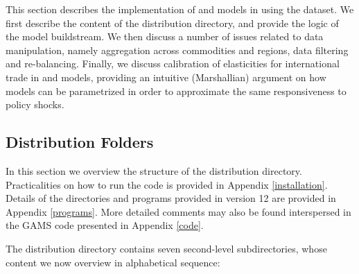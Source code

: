 This section describes the implementation of \GMR and \SOE models in
\GAMS using the  dataset. We first describe the content of the
distribution directory, and provide the logic of the model
buildstream. We then discuss a number of issues related to data
manipulation, namely aggregation across commodities and regions, data
filtering and re-balancing. Finally, we discuss calibration of
elasticities for international trade in \GMR and \SOE models,
providing an intuitive (Marshallian) argument on how models can be
parametrized in order to approximate the same responsiveness to
policy shocks.

\subsection{Distribution Folders}

In this section we overview the structure of the distribution
directory. Practicalities on how to run the code is provided in
Appendix \ref{installation}. Details of the directories and \GAMS
programs provided in \GTAPINGAMS version 12 are provided in Appendix
\ref{programs}. More detailed comments may also be found interspersed
in the GAMS code presented in Appendix \ref{code}.

The distribution directory contains seven second-level subdirectories,
whose content we now overview in alphabetical sequence:

